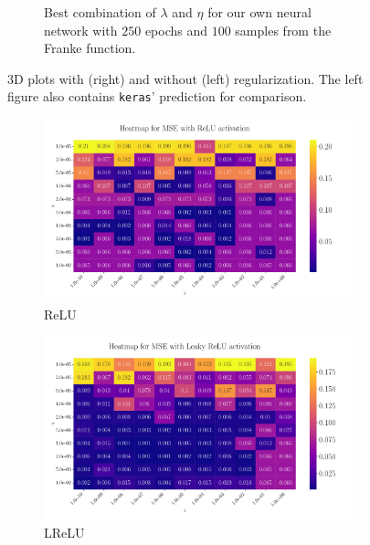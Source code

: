 \documentclass[%
reprint,s
amsmath,amssymb,
aps,
]{revtex4-2}
\begin{document}
\begin{figure}[ht!]
\begin{subfigure}[b]{0.43\textwidth}
		\caption{Best combination of $\lambda$ and $\eta$ for our own neural network with $250$ epochs and $100$ samples from the Franke function.}
		\label{fig:NN_noKeras_3D_Franke_Epochs250}
	\end{subfigure}
	\caption{3D plots with (right) and without (left) regularization. The left figure also contains \texttt{keras}' prediction for comparison.}
\end{figure}

\begin{figure}[ht!]
	\begin{subfigure}{0.41\textwidth}
		\includegraphics[width=\textwidth]{Figures/Heatmap_MSE_ReLU_Franke_Epochs250.pdf}
		\caption{ReLU}
	\end{subfigure}
	\hfill
	\begin{subfigure}{0.41\textwidth}
		\includegraphics[width=\textwidth]{Figures/Heatmap_MSE_Leaky ReLU_Franke_Epochs250.pdf}
		\caption{LReLU}
	\end{subfigure}
	\hfill\newline
	\begin{subfigure}{0.41\textwidth}

\end{subfigure}
\end{figure}
\end{document}
